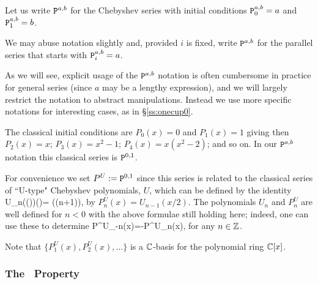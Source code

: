 
\mdef  \label{de:Chebyab}
Let us write ${\mathtt P}^{a,b} $ for the Chebyshev series with initial conditions 
${\mathtt P}^{a,b}_0 = a$ and ${\mathtt P}^{a,b}_1 = b$.  

We may abuse notation slightly and, provided $i$ is fixed, write ${\mathtt P}^{a,b} $ 
for the parallel series that starts with ${\mathtt P}^{a,b}_i =a$. 

As we will see, explicit usage of the ${\mathtt P}^{a,b}$ notation is often cumbersome in practice for general series (since $a$ may be a lengthy expression), and we will largely restrict the notation to abstract manipulations. Instead we use more specific notations for interesting cases, as in \S\ref{ss:onecup0}.  


\mdef 
The classical initial conditions are $P_0(x) =0$ and $P_1(x) =1$ giving then 
$P_2(x) =x $; $P_3(x) = x^2-1$; $P_4(x) = x(x^2 -2)$; and so on. In our ${\mathtt P}^{a,b}$ notation this classical series is ${\mathtt P}^{0,1}$. 

\mdef 
For convenience we set $P^U:={\mathtt P}^{0,1}$ since this series is related to the classical series of ``U-type" Chebyshev polynomials, $U$, which can be defined by the identity
\beq U_n(\cos(\th))\sin(\th)= \sin((n+1)\th),\label{eq:trig}\eq
by $P^U_n(x)=U_{n-1}(x/2)$. The polynomials $U_n$ and $P^U_n$ are well defined for $n<0$ with the above formulae still holding here; indeed, one can use these to determine
\beq P^U_{-n}(x)=-P^U_{n}(x),\label{eq:negcheb} \eq
for any $n\in \mathbb{Z}$. 

\mdef   \label{pr:Cbasis} Note that $\{ P^U_1(x),P^U_2(x),\dots \}$ is a $\mathbb{C}$-basis for the polynomial ring $\mathbb{C}[x]$.

\ignore{{ %
\newcommand{\ptarmigan}{Cheby}
\newcommand{\ramping}{ramping}
\newcommand{\Ramping}{Ramping}
}} 


\subsubsection{The \Ramping\ Property}

